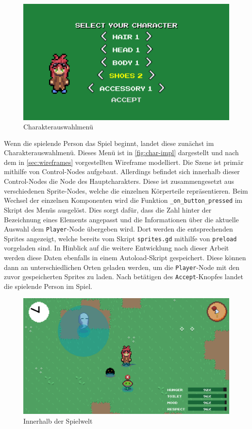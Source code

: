 \begin{figure}[H]
\centering
\includegraphics[width=0.8\columnwidth]{figures/screenshots/charselect.png}
\caption{\label{fig:char-impl}Charakterauswahlmenü}
\end{figure}

Wenn die spielende Person das Spiel beginnt, landet diese zunächst im Charakterauswahlmenü. Dieses Menü ist in \autoref{fig:char-impl} dargestellt und nach dem in \autoref{sec:wireframes} vorgestellten Wireframe modelliert. Die Szene ist primär mithilfe von Control-Nodes aufgebaut. Allerdings befindet sich innerhalb dieser Control-Nodes die Node des Hauptcharakters. Diese ist zusammengesetzt aus verschiedenen Sprite-Nodes, welche die einzelnen Körperteile repräsentieren. Beim Wechsel der einzelnen Komponenten wird die Funktion \texttt{\_on\_button\_pressed} im Skript des Menüs ausgelöst. Dies sorgt dafür, dass die Zahl hinter der Bezeichnung eines Elements angepasst und die Informationen über die aktuelle Auswahl dem \texttt{Player}-Node übergeben wird. Dort werden die entsprechenden Sprites angezeigt, welche bereits vom Skript \texttt{sprites.gd} mithilfe von \texttt{preload} vorgeladen sind. In Hinblick auf die weitere Entwicklung nach dieser Arbeit werden diese Daten ebenfalls in einem Autoload-Skript gespeichert. Diese können dann an unterschiedlichen Orten geladen werden, um die \texttt{Player}-Node mit den zuvor gespeicherten Sprites zu laden. Nach betätigen des \texttt{Accept}-Knopfes landet die spielende Person im Spiel. \\

\begin{figure}[H]
\centering
\includegraphics[width=0.8\columnwidth]{figures/screenshots/ingame.png}
\caption{\label{fig:ingame}Innerhalb der Spielwelt}
\end{figure}

